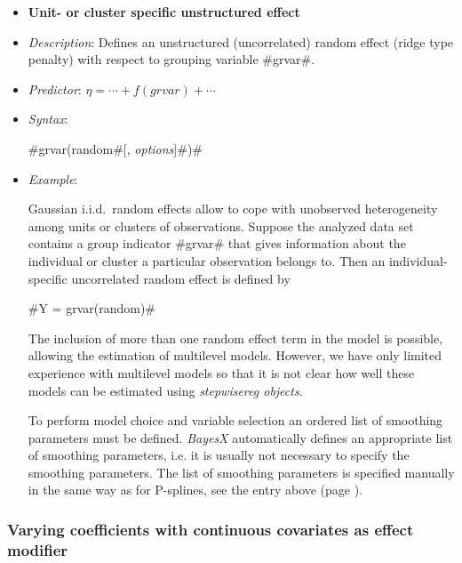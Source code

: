 \begin{itemize}
\item[]{\bf\sffamily Unit- or cluster specific unstructured
effect}

\item[] {\em Description}: Defines an unstructured (uncorrelated) random effect (ridge type penalty) with respect to
    grouping variable #grvar#.
\item[] {\em Predictor}: $\eta = \cdots + f(grvar) + \cdots$ \item[] {\em
Syntax}:

#grvar(random#[, {\em options}]#)#
\item[] {\em Example}:

Gaussian i.i.d.~random effects allow to cope with unobserved
heterogeneity among units or clusters of observations. Suppose the
analyzed data set contains a group indicator #grvar# that gives
information about the individual or cluster a particular
observation belongs to. Then an individual-specific uncorrelated
random effect is defined by

#Y = grvar(random)#

The inclusion of more than one random effect term in the model is
possible, allowing the estimation of multilevel models. However,
we have only limited experience with multilevel models so that it
is not clear how well these models can be estimated using {\em
stepwisereg objects}.


To perform model choice and variable selection an ordered list of smoothing parameters must be defined. {\em BayesX} automatically defines an appropriate list of smoothing
parameters, i.e. it is usually not necessary to  specify the smoothing parameters. The list of smoothing parameters is
specified manually in the same way as for P-splines, see the entry above (page \pageref{psplines_stepwise}).
\end{itemize}

\subsubsection*{Varying coefficients with continuous covariates as
effect modifier}

